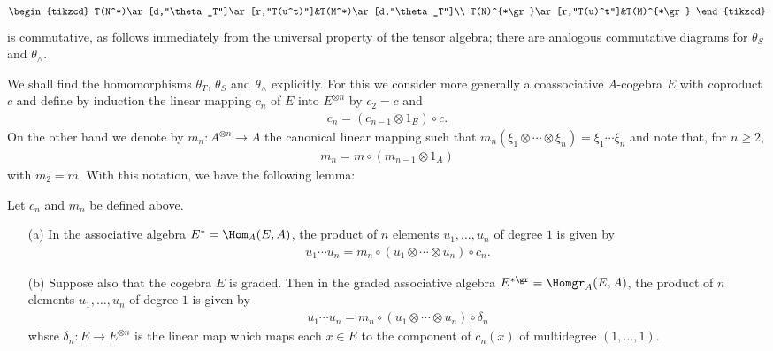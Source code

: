 \[\begin{tikzcd}
T(N^*)\ar[d,"\theta_T"]\ar[r,"T(u^t)"]&T(M^*)\ar[d,"\theta_T"]\\
T(N)^{*\gr}\ar[r,"T(u)^t"]&T(M)^{*\gr}
\end{tikzcd}\]
is commutative, as follows immediately from the universal property of the tensor algebra; there are analogous commutative diagrams for $\theta_S$ and $\theta_{\wedge}$.\par
We shall find the homomorphisms $\theta_T$, $\theta_S$ and $\theta_{\wedge}$ explicitly. For this we consider more generally a coassociative $A$-cogebra $E$ with coproduct $c$ and define by induction the linear mapping $c_n$ of $E$ into $E^{\otimes n}$ by $c_2=c$ and
\begin{align}\label{cogebra coproduct n-th order}
c_n=(c_{n-1}\otimes 1_E)\circ c.
\end{align}
On the other hand we denote by $m_n:A^{\otimes n}\to A$ the canonical linear mapping such that $m_n(\xi_1\otimes\cdots\otimes\xi_n)=\xi_1\cdots\xi_n$ and note that, for $n\geq 2$,
\begin{align}\label{cogebra product n-th order}
m_n=m\circ(m_{n-1}\otimes 1_A)
\end{align}
with $m_2=m$. With this notation, we have the following lemma:
\begin{lemma}\label{cogebra product in dual module formula}
Let $c_n$ and $m_n$ be defined above.
\begin{itemize}
\item[(a)] In the associative algebra $E^*=\Hom_A(E,A)$, the product of $n$ elements $u_1,\dots,u_n$ of degree $1$ is given by
\begin{align}\label{cogebra product on dual formula}
u_1\cdots u_n=m_n\circ(u_1\otimes\cdots\otimes u_n)\circ c_n.
\end{align} 
\item[(b)] Suppose also that the cogebra $E$ is graded. Then in the graded associative algebra $E^{*\gr}=\Homgr_A(E,A)$, the product of $n$ elements $u_1,\dots,u_n$ of degree $1$ is given by
\begin{align}\label{cogebra product on graded dual formula}
u_1\cdots u_n=m_n\circ(u_1\otimes\cdots\otimes u_n)\circ \delta_n
\end{align} 
whsre $\delta_n:E\to E^{\otimes n}$ is the linear map which maps each $x\in E$ to the component of $c_n(x)$ of multidegree $(1,\dots,1)$.
\end{itemize}
\end{lemma}
